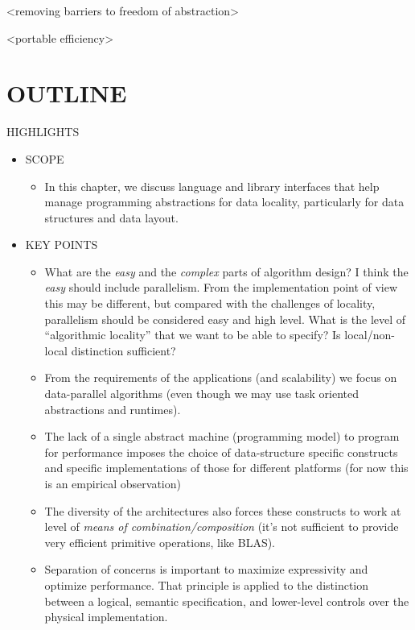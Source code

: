 \begin{itemize}
<removing barriers to freedom of abstraction>

<portable efficiency>

\section{OUTLINE}

HIGHLIGHTS

\begin{itemize}
\item SCOPE
  \begin{itemize}
  \item In this chapter, we discuss language and library interfaces that help manage programming abstractions for data locality, particularly for data structures and data layout. 
  \end{itemize}
\item KEY POINTS
  \begin{itemize}
  \item {}What are the {\em easy} and the {\em complex} parts of algorithm design? I think the {\em easy} should include parallelism. From the implementation point of view this may be different, but compared with the challenges of locality, parallelism should be considered easy and high level. What is the level of ``algorithmic locality'' that we want to be able to specify? Is local/non-local distinction sufficient?
  \item From the requirements of the applications (and scalability) we focus on data-parallel algorithms (even though we may use task oriented abstractions and runtimes).
  \item The lack of a single abstract machine (programming model) to program for performance imposes the choice of data-structure specific constructs and specific implementations of those for different platforms (for now this is an empirical observation)
  \item {}The diversity of the architectures also forces these constructs to work at level of {\em means of combination/composition} (it's not sufficient to provide very efficient primitive operations, like BLAS).
  \item Separation of concerns is important to maximize expressivity and optimize performance.  That principle is applied to the distinction between a logical, semantic specification, and lower-level controls over the physical implementation.

\end{itemize}
\end{itemize}
\end{itemize}
